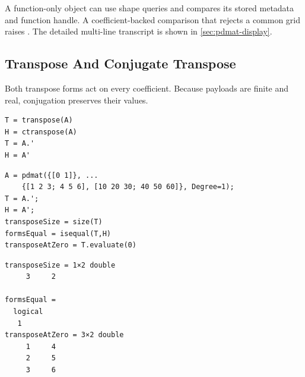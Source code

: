 A function-only object can use shape queries and  compares its stored metadata and function handle. A coefficient-backed comparison that rejects a common grid raises . The detailed multi-line  transcript is shown in \cref{sec:pdmat-display}.

\subsection{Transpose And Conjugate Transpose}
\label{sec:pdmat-matrix-transform}

Both transpose forms act on every coefficient. Because  payloads are finite and real, conjugation preserves their values.

\syntaxhead
\begin{lstlisting}[style=dpsyntax]
T = transpose(A)
H = ctranspose(A)
T = A.'
H = A'
\end{lstlisting}

\examplehead
\begin{lstlisting}[style=dpmatlab]
A = pdmat({[0 1]}, ...
    {[1 2 3; 4 5 6], [10 20 30; 40 50 60]}, Degree=1);
T = A.';
H = A';
transposeSize = size(T)
formsEqual = isequal(T,H)
transposeAtZero = T.evaluate(0)
\end{lstlisting}

\begin{lstlisting}[style=dpoutput]
transposeSize = 1×2 double
     3     2

formsEqual =
  logical
   1
transposeAtZero = 3×2 double
     1     4
     2     5
     3     6
\end{lstlisting}

\begin{center}
\end{center}

